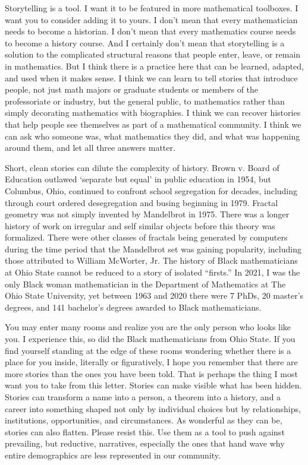 \documentclass[pdflatex,sn-mathphys-num]{sn-jnl}%
\begin{document}
Storytelling is a tool. I want it to be featured in more mathematical toolboxes. I want you to consider adding it to yours. I don't mean that every mathematician needs to become a historian. I don't mean that every mathematics course needs to become a history course. And I certainly don't mean that storytelling is a solution to the complicated structural reasons that people enter, leave, or remain in mathematics. But I think there is a practice here that can be learned, adapted, and used when it makes sense. I think we can learn to tell stories that introduce people, not just math majors or graduate students or members of the professoriate or industry, but the general public, to mathematics rather than simply decorating mathematics with biographies. I think we can recover histories that help people see themselves as part of a mathematical community. I think we can ask who someone was, what mathematics they did, and what was happening around them, and let all three answers matter.

Short, clean stories can dilute the complexity of history. Brown v. Board of Education outlawed `separate but equal' in public education in 1954, but Columbus, Ohio, continued to confront school segregation for decades, including through court ordered desegregation and busing beginning in 1979. Fractal geometry was not simply invented by Mandelbrot in 1975. There was a longer history of work on irregular and self similar objects before this theory was formalized. There were other classes of fractals being generated by computers during the time period that the Mandelbrot set was gaining popularity, including those attributed to William McWorter, Jr. The history of Black mathematicians at Ohio State cannot be reduced to a story of isolated ``firsts.'' In 2021, I was the only Black woman mathematician in the Department of Mathematics at The Ohio State University, yet between 1963 and 2020 there were 7 PhDs, 20 master's degrees, and 141 bachelor's degrees awarded to Black mathematicians. %

You may enter many rooms and realize you are the only person who looks like you. I  experience this, so did the Black mathematicians from Ohio State. If you find yourself standing at the edge of these rooms wondering whether there is a place for you inside, literally or figuratively, I hope you remember that there are more stories than the ones you have been told. That is perhaps the thing I most want you to take from this letter. Stories can make visible what has been hidden. Stories can transform a name into a person, a theorem into a history, and a career into something shaped not only by individual choices but by relationships, institutions, opportunities, and circumstances. As wonderful as they can be, stories can also flatten. Please resist this. Use them as a tool to push against prevailing, but reductive, narratives, especially the ones that hand wave why entire demographics are less represented in our community. 
\end{document}
